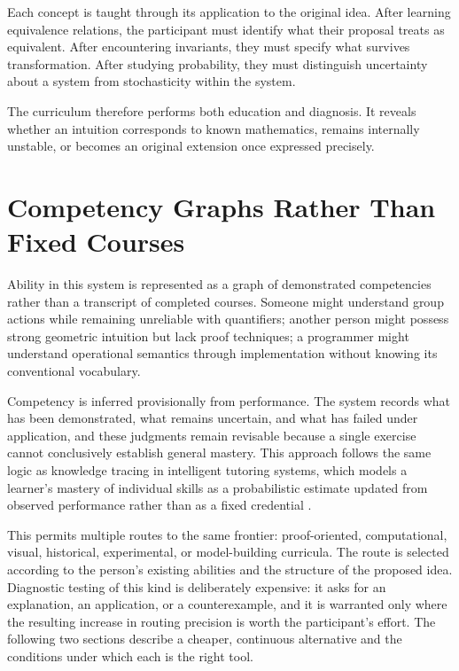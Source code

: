 \documentclass[11pt]{article}
\begin{document}
Each concept is taught through its application to the original idea. After learning equivalence relations, the participant must identify what their proposal treats as equivalent. After encountering invariants, they must specify what survives transformation. After studying probability, they must distinguish uncertainty about a system from stochasticity within the system.

The curriculum therefore performs both education and diagnosis. It reveals whether an intuition corresponds to known mathematics, remains internally unstable, or becomes an original extension once expressed precisely.

\section{Competency Graphs Rather Than Fixed Courses}

Ability in this system is represented as a graph of demonstrated competencies rather than a transcript of completed courses. Someone might understand group actions while remaining unreliable with quantifiers; another person might possess strong geometric intuition but lack proof techniques; a programmer might understand operational semantics through implementation without knowing its conventional vocabulary.

Competency is inferred provisionally from performance. The system records what has been demonstrated, what remains uncertain, and what has failed under application, and these judgments remain revisable because a single exercise cannot conclusively establish general mastery. This approach follows the same logic as knowledge tracing in intelligent tutoring systems, which models a learner's mastery of individual skills as a probabilistic estimate updated from observed performance rather than as a fixed credential \cite{corbett1994}.

This permits multiple routes to the same frontier: proof-oriented, computational, visual, historical, experimental, or model-building curricula. The route is selected according to the person's existing abilities and the structure of the proposed idea. Diagnostic testing of this kind is deliberately expensive: it asks for an explanation, an application, or a counterexample, and it is warranted only where the resulting increase in routing precision is worth the participant's effort. The following two sections describe a cheaper, continuous alternative and the conditions under which each is the right tool.
\end{document}
